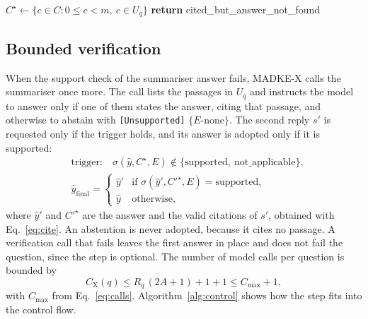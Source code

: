 \begin{algorithm}[!htbp]
\caption{SupportCheck (Eq.~\ref{eq:support})}
\label{alg:support}
$C^\star \leftarrow \{c \in C : 0 \le c < m,\ c \in U_q\}$\;
\textbf{return} cited\_but\_answer\_not\_found\;
\end{algorithm}

\subsection{Bounded verification}
\label{sec:m_verify}

When the support check of the summariser answer fails, MADKE-X calls the summariser once more. The call lists the passages in $U_q$ and instructs the model to answer only if one of them states the answer, citing that passage, and otherwise to abstain with \texttt{[Unsupported]} $\{E\text{-none}\}$. The second reply $s'$ is requested only if the trigger holds, and its answer is adopted only if it is supported:
\begin{equation}
\begin{aligned}
&\text{trigger:}\quad \sigma(\hat y, C^\star, E) \notin \{\text{supported},\ \text{not\_applicable}\},\\
&\hat y_{\mathrm{final}} =
\begin{cases}
\hat y' & \text{if } \sigma(\hat y', C'^\star, E) = \text{supported},\\
\hat y & \text{otherwise},
\end{cases}
\end{aligned}
\label{eq:verify}
\end{equation}
where $\hat y'$ and $C'^\star$ are the answer and the valid citations of $s'$, obtained with Eq.~\eqref{eq:cite}. An abstention is never adopted, because it cites no passage. A verification call that fails leaves the first answer in place and does not fail the question, since the step is optional. The number of model calls per question is bounded by
\begin{equation}
C_{\mathrm{X}}(q) \le R_q\,(2A+1) + 1 + 1 \le C_{\max}+1,
\label{eq:callbound}
\end{equation}
with $C_{\max}$ from Eq.~\eqref{eq:calls}. Algorithm~\ref{alg:control} shows how the step fits into the control flow.

